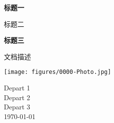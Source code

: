 \documentclass{article}
\begin{document}
    \begin{titlepage}
        \begin{center}
            \vspace*{1cm}

            \Huge
            \textbf{标题一}

            \vspace{0.5cm}
            \LARGE
            标题二

            \vspace{1.5cm}

            \textbf{标题三}


            \vfill

            文档描述

            \vspace{0.8cm}

            \texttt{[image: figures/0000-Photo.jpg]}

            \Large
            Depart 1\\
            Depart 2\\
            Depart 3\\
            \today

        \end{center}
    \end{titlepage}
\end{document}
